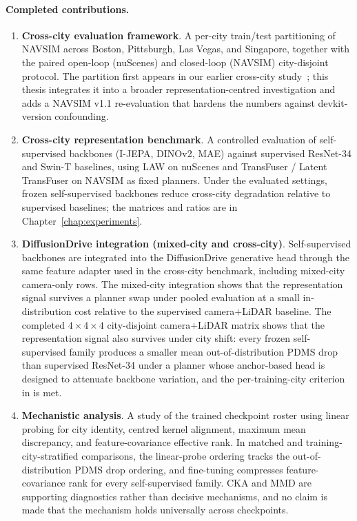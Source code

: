 \paragraph{Completed contributions.}
\begin{enumerate}
    \item \textbf{Cross-city evaluation framework}. A per-city train/test partitioning of NAVSIM across Boston, Pittsburgh, Las Vegas, and Singapore, together with the paired open-loop (nuScenes) and closed-loop (NAVSIM) city-disjoint protocol. The partition first appears in our earlier cross-city study~\cite{naeinian-cross-city-2026}; this thesis integrates it into a broader representation-centred investigation and adds a NAVSIM v1.1 re-evaluation that hardens the numbers against devkit-version confounding.
    \item \textbf{Cross-city representation benchmark}. A controlled evaluation of self-supervised backbones (I-JEPA, DINOv2, MAE) against supervised ResNet-34 and Swin-T baselines, using LAW on nuScenes and TransFuser / Latent TransFuser on NAVSIM as fixed planners. Under the evaluated settings, frozen self-supervised backbones reduce cross-city degradation relative to supervised baselines; the matrices and ratios are in Chapter~\ref{chap:experiments}.
    \item \textbf{DiffusionDrive integration (mixed-city and cross-city)}. Self-supervised backbones are integrated into the DiffusionDrive generative head through the same feature adapter used in the cross-city benchmark, including mixed-city camera-only rows. The mixed-city integration shows that the representation signal survives a planner swap under pooled evaluation at a small in-distribution cost relative to the supervised camera$+$LiDAR baseline. The completed $4 \times 4 \times 4$ city-disjoint camera$+$LiDAR matrix shows that the representation signal also survives under city shift: every frozen self-supervised family produces a smaller mean out-of-distribution PDMS drop than supervised ResNet-34 under a planner whose anchor-based head is designed to attenuate backbone variation, and the per-training-city criterion in  is met.
    \item \textbf{Mechanistic analysis}. A study of the trained checkpoint roster using linear probing for city identity, centred kernel alignment, maximum mean discrepancy, and feature-covariance effective rank. In matched and training-city-stratified comparisons, the linear-probe ordering tracks the out-of-distribution PDMS drop ordering, and fine-tuning compresses feature-covariance rank for every self-supervised family. CKA and MMD are supporting diagnostics rather than decisive mechanisms, and no claim is made that the mechanism holds universally across checkpoints.
\end{enumerate}


